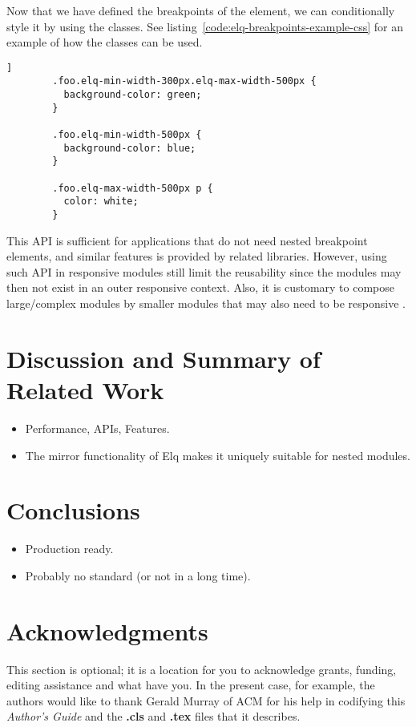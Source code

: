\documentclass{acm_proc_article-sp}
\begin{document}
      Now that we have defined the breakpoints of the element, we can conditionally style it by using the classes.
      See listing~\ref{code:elq-breakpoints-example-css} for an example of how the classes can be used.

      \begin{lstlisting}[gobble=8,caption={},captionpos=b,label={code:elq-breakpoints-example-css}]]
        .foo.elq-min-width-300px.elq-max-width-500px {
          background-color: green;
        }

        .foo.elq-min-width-500px {
          background-color: blue;
        }

        .foo.elq-max-width-500px p {
          color: white;
        }
      \end{lstlisting}

      This API is sufficient for applications that do not need nested breakpoint elements, and similar features is provided by related libraries.
      However, using such API in responsive modules still limit the reusability since the modules may then not exist in an outer responsive context.
      Also, it is customary to compose large/complex modules by smaller modules that may also need to be responsive \cite{parnas1972criteria}.

\section{Discussion and Summary of Related Work}
  \begin{itemize}
    \item Performance, APIs, Features.
    \item The mirror functionality of Elq makes it uniquely suitable for nested modules.
  \end{itemize}

\section{Conclusions}
  \begin{itemize}
    \item Production ready.
    \item Probably no standard (or not in a long time).
  \end{itemize}


\section{Acknowledgments}
This section is optional; it is a location for you
to acknowledge grants, funding, editing assistance and
what have you.  In the present case, for example, the
authors would like to thank Gerald Murray of ACM for
his help in codifying this \textit{Author's Guide}
and the \textbf{.cls} and \textbf{.tex} files that it describes.
\end{document}
